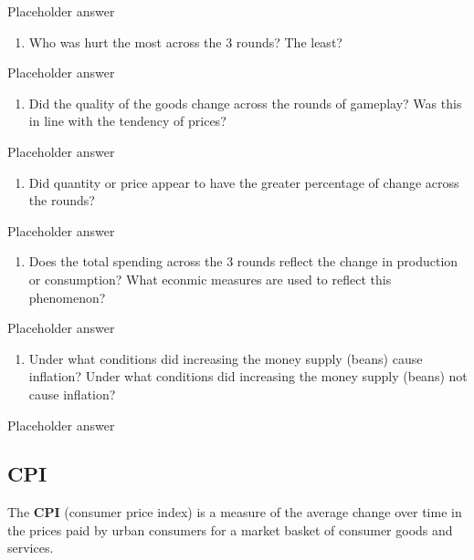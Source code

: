 \documentclass[
  letterpaper,
  DIV=11,
  numbers=noendperiod]{scrartcl}
\providecommand{\tightlist}{%
  \setlength{\itemsep}{0pt}\setlength{\parskip}{0pt}}\usepackage{longtable,booktabs,array}
\begin{document}
Placeholder answer

\begin{enumerate}
\def\labelenumi{\arabic{enumi}.}
\setcounter{enumi}{6}
\tightlist
\item
  Who was hurt the most across the 3 rounds? The least?
\end{enumerate}

Placeholder answer

\begin{enumerate}
\def\labelenumi{\arabic{enumi}.}
\setcounter{enumi}{7}
\tightlist
\item
  Did the quality of the goods change across the rounds of gameplay? Was
  this in line with the tendency of prices?
\end{enumerate}

Placeholder answer

\begin{enumerate}
\def\labelenumi{\arabic{enumi}.}
\setcounter{enumi}{8}
\tightlist
\item
  Did quantity or price appear to have the greater percentage of change
  across the rounds?
\end{enumerate}

Placeholder answer

\begin{enumerate}
\def\labelenumi{\arabic{enumi}.}
\setcounter{enumi}{9}
\tightlist
\item
  Does the total spending across the 3 rounds reflect the change in
  production or consumption? What econmic measures are used to reflect
  this phenomenon?
\end{enumerate}

Placeholder answer

\begin{enumerate}
\def\labelenumi{\arabic{enumi}.}
\setcounter{enumi}{10}
\tightlist
\item
  Under what conditions did increasing the money supply (beans) cause
  inflation? Under what conditions did increasing the money supply
  (beans) not cause inflation?
\end{enumerate}

Placeholder answer

\subsection{CPI}\label{cpi}

The \textbf{CPI} (consumer price index) is a measure of the average
change over time in the prices paid by urban consumers for a market
basket of consumer goods and services.
\end{document}
